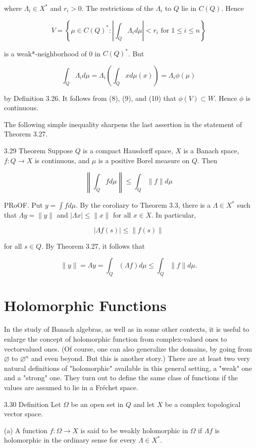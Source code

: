 \documentclass[10pt]{article}
\begin{document}
where $\Lambda_{i} \in X^{*}$ and $r_{i}>0$. The restrictions of the $\Lambda_{i}$ to $Q$ lie in $C(Q)$. Hence

$$
V=\left\{\mu \in C(Q)^{*}:\left|\int_{Q} \Lambda_{i} d \mu\right|<r_{i} \text { for } 1 \leq i \leq n\right\}
$$

is a weak*-neighborhood of 0 in $C(Q)^{*}$. But

$$
\int_{Q} \Lambda_{i} d \mu=\Lambda_{i}\left(\int_{Q} x d \mu(x)\right)=\Lambda_{i} \phi(\mu)
$$

by Definition 3.26. It follows from (8), (9), and (10) that $\phi(V) \subset W$. Hence $\phi$ is continuous.

The following simple inequality sharpens the last assertion in the statement of Theorem 3.27.

3.29 Theorem Suppose $Q$ is a compact Hausdorff space, $X$ is a Banach space, $f: Q \rightarrow X$ is continuous, and $\mu$ is a positive Borel measure on $Q$. Then

$$
\left\|\int_{Q} f d \mu\right\| \leq \int_{Q}\|f\| d \mu
$$

PRoOF. Put $y=\int f d \mu$. By the coroliary to Theorem 3.3, there is a $\Lambda \in X^{*}$ such that $\Lambda y=\|y\|$ and $|\Lambda x| \leq\|x\|$ for all $x \in X$. In particular,

$$
|\Lambda f(s)| \leq\|f(s)\|
$$

for all $s \in Q$. By Theorem 3.27, it follows that

$$
\|y\|=\Lambda y=\int_{Q}(\Lambda f) d \mu \leq \int_{Q}\|f\| d \mu .
$$

\section{Holomorphic Functions}
In the study of Banach algebras, as well as in some other contexts, it is useful to enlarge the concept of holomorphic function from complex-valued ones to vectorvalued ones. (Of course, one can also generalize the domains, by going from $\varnothing$ to $\varnothing^{n}$ and even beyond. But this is another story.) There are at least two very natural definitions of "holomorphic" available in this general setting, a "weak" one and a "strong" one. They turn out to define the same class of functions if the values are assumed to lie in a Fréchet space.

3.30 Definition Let $\Omega$ be an open set in $Q$ and let $X$ be a complex topological vector space.

(a) A function $f: \Omega \rightarrow X$ is said to be weakly holomorphic in $\Omega$ if $\Lambda f$ is holomorphic in the ordinary sense for every $\Lambda \in X^{*}$.
\end{document}

